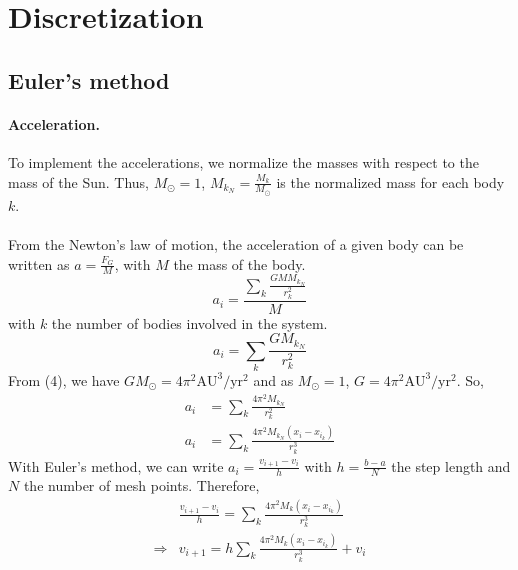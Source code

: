 \documentclass[a4paper, twoside, 11pt]{report}
\theoremstyle{theorem}
\theoremstyle{remark}
\theoremstyle{exemple}
\begin{document}
    \section{Discretization}
        \subsection{Euler's method}
            \paragraph{Acceleration.}To implement the accelerations, we normalize the masses with respect to the mass of the Sun. Thus, $M_{\odot}=1$, $M_{k_N}=\frac{M_k}{M_{\odot}}$ is the normalized mass for each body $k$.
            \paragraph{} From the Newton's law of motion, the acceleration of a given body can be written as $a=\frac{F_G}{M}$, with $M$ the mass of the body. 
                \begin{equation*}
                    a_i = \frac{ \sum\limits_{k} \frac{GMM_{k_N}}{r_k^2}}{M}
                \end{equation*}
            with $k$ the number of bodies involved in the system. 
                \begin{equation*}
                    a_i = \sum\limits_{k} \frac{GM_{k_N}}{r_k^2}
                \end{equation*}
            From (4), we have $GM_{\odot} = 4\pi^2\mathrm{AU}^3/\mathrm{yr}^2$ and as $M_{\odot}=1$, $G=4\pi^2\mathrm{AU}^3/\mathrm{yr}^2$. So,
                \begin{align*}
                    a_i &= \sum\limits_{k} \frac{4\pi^2M_{k_N}}{r_k^2} \\
                    a_i &= \sum\limits_{k} \frac{4\pi^2M_{k_N}(x_i-x_{i_k})}{r_k^3} 
                    \tag{7}
                 \end{align*}
             With Euler's method, we can write $\displaystyle a_i=\frac{v_{i+1} - v_i}{h}$ with $\displaystyle h = \frac{b-a}{N}$ the step length and $N$ the number of mesh points. Therefore, 
                \begin{align*}
                     &\frac{v_{i+1} - v_i}{h} = \sum\limits_{k}\frac{4\pi^2M_k(x_i-x_{i_k})}{r_k^3} \\
                     \Rightarrow &v_{i+1} = h\sum\limits_{k}\frac{4\pi^2M_k(x_i-x_{i_k})}{r_k^3} + v_i
                    \tag{8}
                \end{align*}
\end{document}
